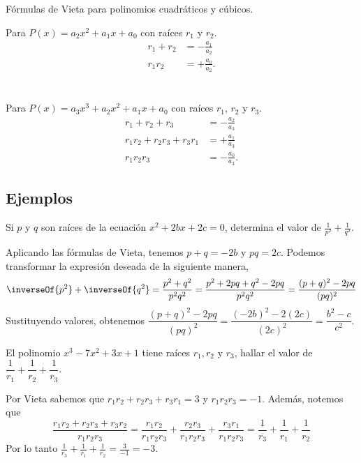 \begin{remark.tcb}
    \begin{center}
        Fórmulas de Vieta para polinomios cuadráticos y cúbicos.
    \end{center}

    \setlength{\columnsep}{0.5cm}
    \setlength{\columnseprule}{0.1pt}
    \begin{multicols}{2}
        Para $P(x) = a_2 x^2 + a_1 x + a_0$ con raíces $r_1$ y $r_2$.
        \begin{align*}
            r_1 + r_2 &= - \frac{a_1}{a_2}\\[1mm]
            r_1 r_2 &= +\frac{a_0}{a_2}.
        \end{align*}
        \\
        \vspace{5mm}\\
        Para $P(x) = a_3 x^3 + a_2 x^2 + a_1 x + a_0$ con raíces $r_1$, $r_2$ y $r_3$.
        \begin{align*}
            r_1 + r_2 + r_3 &= - \frac{a_2}{a_3}\\[1mm]
            r_1 r_2 + r_2 r_3 + r_3 r_1 &= +\frac{a_1}{a_3}\\[1mm]
            r_1 r_2 r_3 &= - \frac{a_0}{a_3}.
        \end{align*}
    \end{multicols}
\end{remark.tcb}


\subsection{Ejemplos}

\begin{example}
    Si $p$ y $q$ son raíces de la ecuación $x^2 + 2bx + 2c = 0$, determina el valor de $\frac{1}{p^2} + \frac{1}{q^2}.$
\end{example}
\begin{solution}
    Aplicando las fórmulas de Vieta, tenemos $p + q = - 2b$ y $pq = 2c$.
    Podemos transformar la expresión deseada de la siguiente manera,
    \[
        \inverseOf{p^2} + \inverseOf{q^2} = \frac{p^2 + q^2}{p^2 q^2} = \frac{p^2 + 2pq + q^2 - 2pq}{p^2 q^2} = \frac{ (p + q)^2 - 2pq}{(pq)^2}
    \]
    Sustituyendo valores, obtenemos $\dfrac{(p + q)^2 - 2pq}{(pq)^2} = \dfrac{ (-2b)^2 - 2(2c)}{(2c)^2} = \boxed{\dfrac{b^2 - c}{c^2}}$.
\end{solution}

\begin{example}
    El polinomio $x^3 - 7 x^2 + 3x + 1$ tiene raíces $r_1, r_2$ y  $r_3$, hallar el valor de $\dfrac{1}{r_1} + \dfrac{1}{r_2} + \dfrac{1}{r_3}$.
\end{example}
\begin{solution}
    Por Vieta sabemos que $r_1 r_2 + r_2 r_3 + r_3 r_1 = 3$ y $r_1 r_2 r_3 = -1$.
    Además, notemos que
    \[
        \frac{r_1 r_2 + r_2 r_3 + r_3 r_2}{r_1 r_2 r_3} = \frac{r_1 r_2}{r_1 r_2 r_3} + \frac{r_2 r_3}{r_1 r_2 r_3} + \frac{r_3 r_1}{r_1 r_2 r_3} = \frac{1}{r_3} + \frac{1}{r_1} + \frac{1}{r_2}
    \]
    Por lo tanto $\frac{1}{r_3} + \frac{1}{r_1} + \frac{1}{r_2} = \frac{3}{-1} = \boxed{-3}$.
\end{solution}

